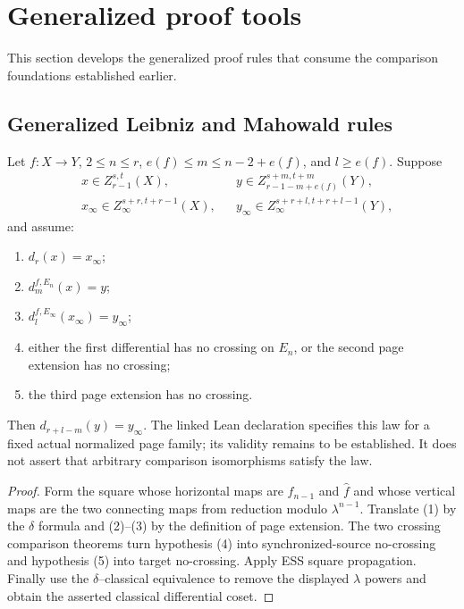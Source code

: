 \section{Generalized proof tools}
\label{chap:generalized-tools}

This section develops the generalized proof rules that consume the comparison
foundations established earlier.

\subsection{Generalized Leibniz and Mahowald rules}

\begin{theorem}
  \label{thm:generalized-leibniz}
  \notready
  Let $f:X\to Y$, $2\le n\le r$,
  $e(f)\le m\le n-2+e(f)$, and $l\ge e(f)$.  Suppose
  \[
  \begin{aligned}
    &x\in Z_{r-1}^{s,t}(X),&&
    y\in Z_{r-1-m+e(f)}^{s+m,t+m}(Y),\\
    &x_\infty\in Z_\infty^{s+r,t+r-1}(X),&&
    y_\infty\in Z_\infty^{s+r+l,t+r+l-1}(Y),
  \end{aligned}
  \]
  and assume:
  \begin{enumerate}
    \item $d_r(x)=x_\infty$;
    \item $d_m^{f,E_n}(x)=y$;
    \item $d_l^{f,E_\infty}(x_\infty)=y_\infty$;
    \item either the first differential has no crossing on $E_n$, or the
      second page extension has no crossing;
    \item the third page extension has no crossing.
  \end{enumerate}
  Then $d_{r+l-m}(y)=y_\infty$.
  The linked Lean declaration specifies this law for a fixed actual
  normalized page family; its validity remains to be established.
  It does not assert that arbitrary comparison isomorphisms satisfy the law.
\end{theorem}

\begin{proof}
  Form the square whose horizontal maps are
  $\widehat f_{n-1}$ and $\widehat f$ and whose vertical maps are the two
  connecting maps from reduction modulo $\lambda^{n-1}$.  Translate (1) by the
  $\delta$ formula and (2)--(3) by the definition of page extension.  The two
  crossing comparison theorems turn hypothesis (4) into synchronized-source
  no-crossing and hypothesis (5) into target no-crossing.  Apply ESS square
  propagation.  Finally use the $\delta$--classical equivalence to remove the
  displayed $\lambda$ powers and obtain the asserted classical differential
  coset.
\end{proof}

